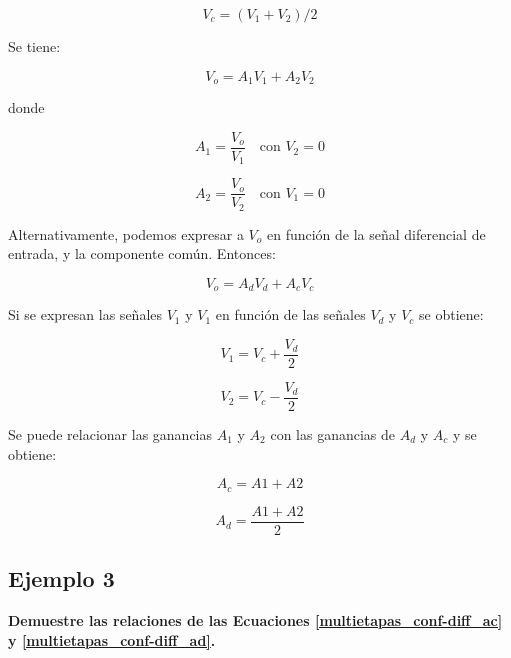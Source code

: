 \begin{equation}
	V_c = (V_1 + V_2)/2
\end{equation}

Se tiene:

\begin{equation}
	V_o = A_1 V_1 + A_2 V_2
\end{equation}

donde

\begin{equation}
	A_1 = \frac{V_o}{V_1} \quad \text{con } V_2 = 0
\end{equation}

\begin{equation}
	A_2 = \frac{V_o}{V_2} \quad \text{con } V_1 = 0
\end{equation}

Alternativamente, podemos expresar a $V_o$ en función de la señal diferencial de entrada, y la componente común. Entonces:

\begin{equation}
	V_o = A_d V_d + A_c V_c
\end{equation}

Si se expresan las señales $V_1$ y $V_1$ en función de las señales $V_d$ y $V_c$ se obtiene:

\begin{equation}
	V_1 = V_c + \frac{V_d}{2}
\end{equation}

\begin{equation}
	V_2 = V_c - \frac{V_d}{2}
\end{equation}

Se puede relacionar las ganancias $A_1$ y $A_2$ con las ganancias de $A_d$ y $A_c$ y se obtiene:

\begin{equation} \label{multietapas_conf-diff_ac}
	A_c = A1 + A2
\end{equation}

\begin{equation} \label{multietapas_conf-diff_ad}
	A_d = \frac{A1 + A2}{2}
\end{equation}

\subsection{Ejemplo 3}

\textbf{Demuestre las relaciones de las Ecuaciones \ref{multietapas_conf-diff_ac} y \ref{multietapas_conf-diff_ad}.}

